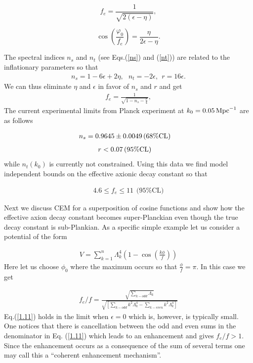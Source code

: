 \documentclass[12pt]{article}
\begin{document}
\begin{equation}\label{DisplayFormulaNumbered:eq.fe.slowRoll} 
	f_e=\frac{1}{\sqrt{2\left(\epsilon-\eta\right)}},
\end{equation}

\begin{equation}\label{DisplayFormulaNumbered:eq.fieldInitial.slowRoll} 
	\cos\left(\frac{\varphi_0}{f_e}\right)=\frac{\eta}{2\epsilon-\eta}.
\end{equation}

The spectral indices $n_s$ and $n_t$ (see Eqs.(\ref{ns}) and (\ref{nt})) 
are related to the inflationary parameters so that 
\begin{align}
n_s= 1-6\epsilon + 2 \eta, ~~~n_t = -2 \epsilon, ~~ r = 16 \epsilon.
\label{ns-nt-r}
\end{align}
We can thus eliminate $\eta$ and $\epsilon$ in favor of $n_s$ and $r$ and get
\begin{align}
	f_e=\frac{1}{\sqrt{1-n_s- \frac{r}{4}}},
\end{align}
The current experimental limits from Planck experiment at $k_0=0.05\, {\rm Mpc}^{-1}$ are as follows
~\cite{Adam:2015rua,Ade:2015lrj,Array:2015xqh} 

\begin{align}
 n_s& = 0.9645 \pm 0.0049\, (68\% {\rm CL}) 
 \end{align}
 \begin{align}
 r & <0.07\, (95\% {\rm CL})
\label{data}
\end{align}
while $n_t(k_0)$ is currently not constrained.  Using this data we find model independent bounds on the effective axionic decay constant
so that 

\begin{align}
 4.6 \leq f_e \leq 11   ~~(95\% \text{CL)}
\end{align}

Next we discuss  CEM for a superposition of cosine functions and show how the effective axion decay constant becomes super-Planckian
even though the true decay constant is sub-Plankian.
As a specific simple example let us consider a potential of the form

\begin{align}
V = \sum_{k=1}^n\Lambda_k^4 \left(1-\cos(\frac{k\phi}{ f})\right)
\label{1.1}
\end{align}
Here let us choose $\phi_0$ where the maximum occurs so that $\frac{\phi}{ f}= \pi$. In this case we get 

\begin{align}
{f_e}/f = \frac{\sqrt{ \sum_{k-odd}\Lambda_k}
}{ \sqrt{\left[ \sum_{k-odd} k^2\Lambda_k^4 - \sum_{k-even} k^2\Lambda_k^4\right]}} 
\label{1.11}
\end{align}
Eq.(\ref{1.11}) holds in the limit when $\epsilon=0$ which is, however, is typically small.
One notices that  there is cancellation between the odd and even sums in the denominator in Eq. (\ref{1.11}) which 
leads to an enhancement and gives  $f_e/f >1$. Since the enhancement occurs as a consequence of the sum of several terms  one 
may call this  a ``coherent enhancement mechanism''. 
\end{document}
